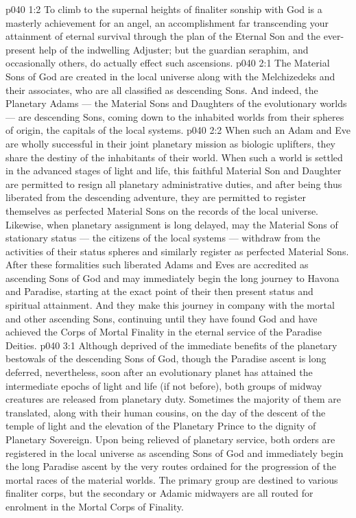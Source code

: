 \vs p040 1:2 To climb to the supernal heights of finaliter sonship with God is a masterly achievement for an angel, an accomplishment far transcending your attainment of eternal survival through the plan of the Eternal Son and the ever\hyp{}present help of the indwelling Adjuster; but the guardian seraphim, and occasionally others, do actually effect such ascensions.
\vs p040 2:1 The Material Sons of God are created in the local universe along with the Melchizedeks and their associates, who are all classified as descending Sons. And indeed, the Planetary Adams --- the Material Sons and Daughters of the evolutionary worlds --- are descending Sons, coming down to the inhabited worlds from their spheres of origin, the capitals of the local systems.
\vs p040 2:2 When such an Adam and Eve are wholly successful in their joint planetary mission as biologic uplifters, they share the destiny of the inhabitants of their world. When such a world is settled in the advanced stages of light and life, this faithful Material Son and Daughter are permitted to resign all planetary administrative duties, and after being thus liberated from the descending adventure, they are permitted to register themselves as perfected Material Sons on the records of the local universe. Likewise, when planetary assignment is long delayed, may the Material Sons of stationary status --- the citizens of the local systems --- withdraw from the activities of their status spheres and similarly register as perfected Material Sons. After these formalities such liberated Adams and Eves are accredited as ascending Sons of God and may immediately begin the long journey to Havona and Paradise, starting at the exact point of their then present status and spiritual attainment. And they make this journey in company with the mortal and other ascending Sons, continuing until they have found God and have achieved the Corps of Mortal Finality in the eternal service of the Paradise Deities.
\vs p040 3:1 Although deprived of the immediate benefits of the planetary bestowals of the descending Sons of God, though the Paradise ascent is long deferred, nevertheless, soon after an evolutionary planet has attained the intermediate epochs of light and life (if not before), both groups of midway creatures are released from planetary duty. Sometimes the majority of them are translated, along with their human cousins, on the day of the descent of the temple of light and the elevation of the Planetary Prince to the dignity of Planetary Sovereign. Upon being relieved of planetary service, both orders are registered in the local universe as ascending Sons of God and immediately begin the long Paradise ascent by the very routes ordained for the progression of the mortal races of the material worlds. The primary group are destined to various finaliter corps, but the secondary or Adamic midwayers are all routed for enrolment in the Mortal Corps of Finality.
